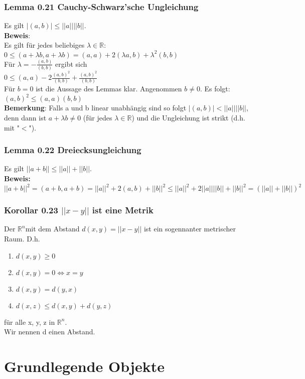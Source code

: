 \documentclass{scrartcl}
\newcommand{\lb}{\lambda}
\newcommand{\R}{\mathbb{R}}
\newcommand{\mRn}{\(\mathbb{R}^n\)}
\begin{document}
\subsubsection{Lemma 0.21 Cauchy-Schwarz'sche Ungleichung}
Es gilt \(|(a, b)| \le ||a||||b||\).\\
\textbf{Beweis}:\\
Es gilt f\"ur jedes beliebiges \(\lb \in \R\):\\
\(0 \le (a + \lb b, a + \lb b) = (a, a) + 2 (\lb a, b) + \lb^2 (b, b)\)\\
F\"ur \(\lb = -\frac{(a,b)}{(b, b)}\) ergibt sich\\
\(0 \le (a, a) - 2 \frac{(a, b)^2}{(b, b)} + \frac{(a, b)^2}{(b, b)}\)\\
F\"ur \(b = 0\) ist die Aussage des Lemmas klar. Angenommen \(b \neq 0\). Es folgt:\\
\((a,b)^2 \le (a, a)(b,b)\)\\
\textbf{Bemerkung}: Falls a und b linear unabh\"angig sind so folgt \(|(a,b)| < ||a||||b||\), denn dann ist \(a + \lb b \neq 0\) (f\"ur jedes \(\lb \in \R\)) und die Ungleichung ist strikt (d.h. mit "\(<\)").

\subsubsection{Lemma 0.22 Dreiecksungleichung}
Es gilt \(||a+b|| \le ||a|| + ||b||\).\\
\textbf{Beweis:}\\
\( ||a+b||^2 = (a+b, a+b)= ||a||^2 + 2(a,b) + ||b||^2 \le ||a||^2 + 2 ||a||||b|| + ||b||^2 = (||a|| + ||b||)^2\)

\subsubsection{Korollar 0.23 \(||x-y||\) ist eine Metrik}
Der \mRn mit dem Abstand \(d(x, y) = ||x - y||\) ist ein sogennanter metrischer Raum. D.h.
\begin{enumerate}
\item{
\(d(x, y) \ge 0\)}
\item{\(d(x, y) = 0 \Leftrightarrow x = y\)}
\item{\(d(x, y) = d(y, x)\)}
\item{\(d(x, z) \le d(x,y) + d(y,z)\)}
\end{enumerate}
f\"ur alle x, y, z in \mRn.\\
Wir nennen d einen Abstand.

\section{Grundlegende Objekte}
\end{document}
